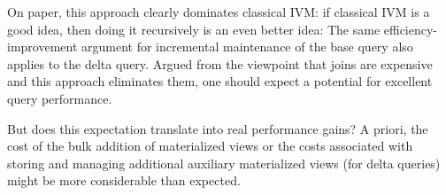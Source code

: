 
On paper, this approach clearly dominates classical IVM: if classical IVM is a good idea, then doing it recursively is an even better idea: The same efficiency-improvement argument for incremental maintenance of the base query also applies to the delta query. Argued from the viewpoint that joins are expensive and this approach eliminates them, one should expect a potential for excellent query performance.

But does this expectation translate into real performance gains? A priori, the cost of the bulk addition of materialized views or the costs associated with storing and managing additional auxiliary materialized views (for delta queries) might be more considerable than expected.


\medskip



